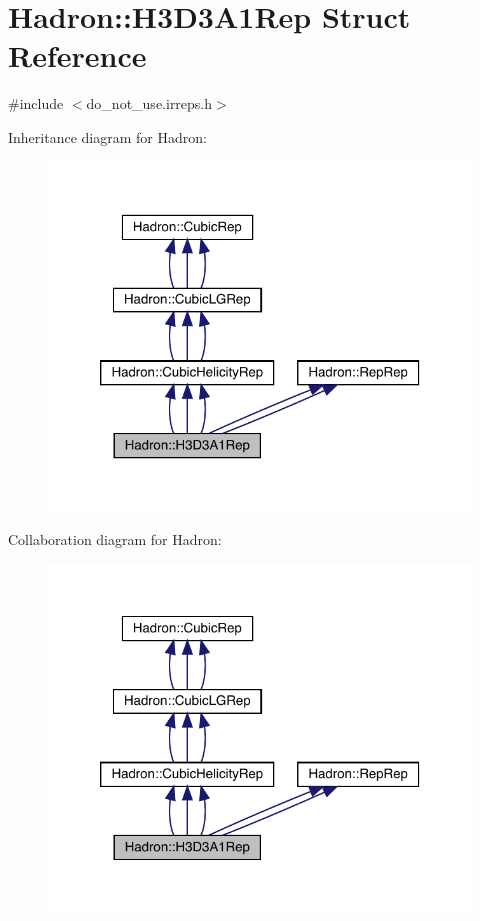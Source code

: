 \hypertarget{structHadron_1_1H3D3A1Rep}{}\section{Hadron\+:\+:H3\+D3\+A1\+Rep Struct Reference}
\label{structHadron_1_1H3D3A1Rep}


{\ttfamily \#include $<$do\+\_\+not\+\_\+use.\+irreps.\+h$>$}



Inheritance diagram for Hadron\+:
\nopagebreak
\begin{figure}[H]
\begin{center}
\leavevmode
\includegraphics[width=320pt]{d1/d64/structHadron_1_1H3D3A1Rep__inherit__graph}
\end{center}
\end{figure}


Collaboration diagram for Hadron\+:
\nopagebreak
\begin{figure}[H]
\begin{center}
\leavevmode
\includegraphics[width=320pt]{dc/d8c/structHadron_1_1H3D3A1Rep__coll__graph}
\end{center}
\end{figure}

